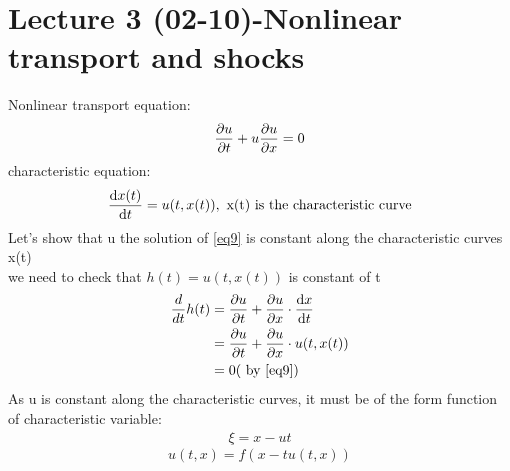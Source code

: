 \section{Lecture 3 (02-10)-Nonlinear transport and shocks}
Nonlinear transport equation:
\begin{equation}
   \label{eq9} \pdv{u}{t}+u\pdv{u}{x}=0
\end{equation}
characteristic equation:
\begin{equation}
    \label{eq10}\dv{x(t)}{t}=u(t,x(t)),\text{ x(t) is the characteristic curve} 
\end{equation}
Let's show that u the solution of \eqref{eq9} is constant along the characteristic curves x(t)
\\we need to check that $ h(t)=u(t,x(t)) $ is constant of t
\begin{align*}{}{}
\frac{d}{dt}h(t)&=\pdv{u}{t}(t,x(t))+\pdv{u}{x}(t,x(t))\cdot\dv{x}{t}\\
&=\pdv{u}{t}(t,x(t))+\pdv{u}{x}\cdot u(t,x(t))\\
&=0 (\text{ by }\eqref{eq9})
\end{align*}
As u is constant along the characteristic curves, it must be of the form function of characteristic variable:
\begin{align*}{}{}
    \xi=x-ut
\end{align*}
\begin{equation}
    \label{eq11} u(t,x)=f(x-tu(t,x))
\end{equation}
